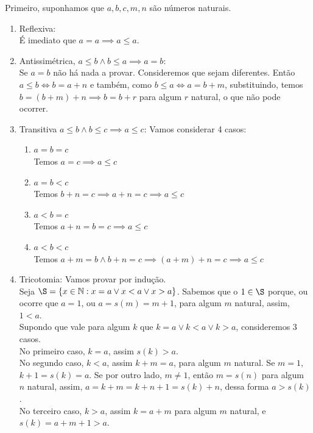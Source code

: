 \documentclass[../main.tex]{subfiles}
\begin{document}
\begin{dem}
    Primeiro, suponhamos que $a,b,c,m,n$ são números naturais.
    \begin{enumerate}[label=(\roman*)]
        \item Reflexiva: \\
            É imediato que $a = a \implies a \leq a$.
        \item Antissimétrica, $a \leq b \land b \leq a \implies a=b$: \\
            Se $a=b$ não há nada a provar. Consideremos que sejam diferentes.
            Então $a \leq b \iff b = a + n$ e também, como $b \leq a \iff a = b + m$, substituindo, temos $b = (b+m) + n \implies b = b+r$ para algum $r$ natural, o que não pode ocorrer. %
        \item Transitiva $a \leq b \land b \leq c \implies a \leq c$: 
            Vamos considerar 4 casos:
            \begin{enumerate}[label=(\arabic*)]
                \item $a = b = c$ \\
                    Temos $a = c \implies a \leq c$\\
                \item $a = b < c$ \\
                    Temos $ b + n = c \implies a + n = c\implies a \leq c$\\
                \item $a < b = c$ \\
                    Temos $a + n = b = c \implies a \leq c$\\
                \item $a < b < c$ \\
                    Temos $a + m = b \land b + n = c \implies ( a + m ) + n = c \implies a \leq c$
            \end{enumerate}
        \item Tricotomia:
        Vamos provar por indução. \\
        Seja $\S = \{ x \in \mathbb{N} : x = a \lor x < a \lor x > a \}$. Sabemos que o $1 \in \S$ porque, ou ocorre que $a = 1$, ou $a = s(m) = m + 1$, para algum $m$ natural, assim, $1 < a$. \\
        Supondo que vale para algum $k$ que $k = a \lor k < a \lor k > a$, consideremos 3 casos.  \\
        
        No primeiro caso, $k = a$, assim $s(k) > a$. \\
        No segundo caso, $k < a$, assim $k + m = a$, para algum $m$ natural. Se $m = 1$, $k+1 = s(k) = a$. Se por outro lado, $m \neq 1$, então $m = s(n)$ para algum $n$ natural, assim, $a = k + m = k + n + 1 = s(k) + n$, dessa forma $a > s(k)$. \\
        No terceiro caso, $k > a$, assim $k = a + m$ para algum $m$ natural, e $s(k) = a + m + 1 > a$.


\end{enumerate}
\end{dem}
\end{document}

